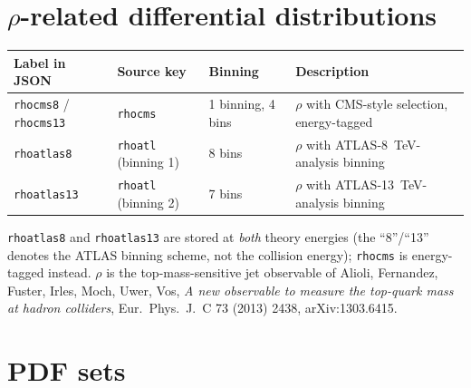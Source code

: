 \documentclass[11pt,a4paper]{article}
\newcommand{\code}[1]{\texttt{#1}}
\begin{document}
\section*{$\rho$-related differential distributions}

\begin{table}[h]
\centering
\begin{tabular}{@{}llll@{}}
\toprule
Label in JSON & Source key & Binning & Description \\
\midrule
\code{rhocms8} / \code{rhocms13} & \code{rhocms} & 1 binning, 4 bins & $\rho$ with CMS-style selection, energy-tagged \\
\code{rhoatlas8} & \code{rhoatl} (binning 1) & 8 bins & $\rho$ with ATLAS-8~TeV-analysis binning \\
\code{rhoatlas13} & \code{rhoatl} (binning 2) & 7 bins & $\rho$ with ATLAS-13~TeV-analysis binning \\
\bottomrule
\end{tabular}
\end{table}

\noindent \code{rhoatlas8} and \code{rhoatlas13} are stored at \emph{both}
theory energies (the ``8''/``13'' denotes the ATLAS binning scheme, not the
collision energy); \code{rhocms} is energy-tagged instead. $\rho$ is the
top-mass-sensitive jet observable of Alioli, Fernandez, Fuster, Irles, Moch,
Uwer, Vos, \emph{A new observable to measure the top-quark mass at hadron
colliders}, Eur.\ Phys.\ J.\ C 73 (2013) 2438, arXiv:1303.6415.

\section*{PDF sets}
\end{document}
